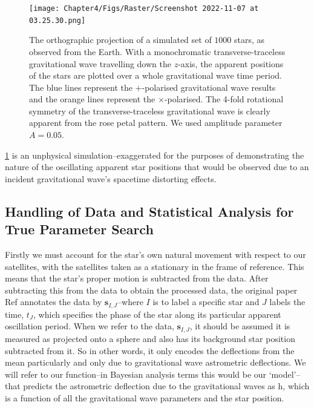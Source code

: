 \begin{figure} 
\centering    
\texttt{[image: Chapter4/Figs/Raster/Screenshot 2022-11-07 at 03.25.30.png]}
\caption{\label{fig:epsart1} The orthographic projection of a simulated set of $1000$ stars, as observed from the Earth. With a monochromatic transverse-traceless gravitational wave travelling down the $z$-axis, the apparent positions of the stars are plotted over a whole gravitational wave time period. The blue lines represent the $+$-polarised gravitational wave results and the orange lines represent the $\times$-polarised. The 4-fold rotational symmetry of the transverse-traceless gravitational wave is clearly apparent from the rose petal pattern. We used amplitude parameter $A=0.05$.}
\end{figure}


\cref{fig:epsart1} is an unphysical simulation--exaggerated for the purposes of demonstrating the nature of the oscillating apparent star positions that would be observed due to an incident gravitational wave's spacetime distorting effects.


\subsection{Handling of Data and Statistical Analysis for True Parameter Search}\label{sec:data_handling}

Firstly we must account for the star's own natural movement with respect to our satellites, with the satellites taken as a stationary in the frame of reference. This means that the star's proper motion is subtracted from the data. After subtracting this from the data to obtain the processed data, the original paper Ref \cite{Mihaylov_2020} annotates the data by $\textbf{s}_{I,J}$--where $I$ is to label a specific star and $J$ labels the time, $t_J$, which specifies the phase of the star along its particular apparent oscillation period. When we refer to the data, $\textbf{s}_{I,J}$, it should be assumed it is measured as projected onto a sphere and also has its background star position subtracted from it. So in other words, it only encodes the deflections from the mean particularly and only due to gravitational wave astrometric deflections. We will refer to our function--in Bayesian analysis terms this would be our `model'--that predicts the astrometric deflection due to the gravitational waves as  $\mathbf{ \mathrm{h} }$, which is a function of all the gravitational wave parameters and the star position.

